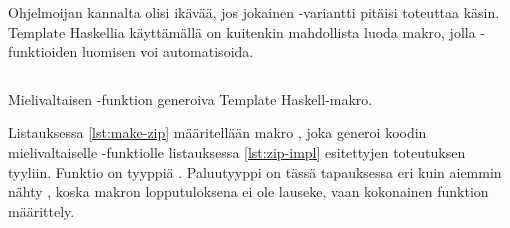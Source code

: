 Ohjelmoijan kannalta olisi ikävää, jos jokainen -variantti pitäisi toteuttaa käsin.
Template Haskellia käyttämällä on kuitenkin mahdollista luoda makro,
jolla -funktioiden luomisen voi automatisoida.

\begin{listing}[H]
    \inputminted{haskell}{codes/zip-generator/MakeZip.hs}
    \label{lst:make-zip}
    \caption{Mielivaltaisen -funktion generoiva Template Haskell-makro.}
\end{listing}

Listauksessa \ref{lst:make-zip} määritellään makro ,
joka generoi koodin mielivaltaiselle -funktiolle listauksessa \ref{lst:zip-impl}
esitettyjen toteutuksen tyyliin.
Funktio  on tyyppiä .
Paluutyyppi on tässä tapauksessa eri kuin aiemmin nähty ,
koska makron lopputuloksena ei ole lauseke,
vaan kokonainen funktion määrittely.

